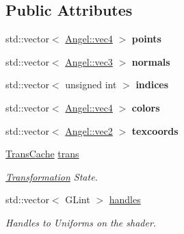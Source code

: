 \subsection*{Public Attributes}
\begin{DoxyCompactItemize}
\item 
\hypertarget{class_object_a8dec70177d147f59ba10c9eba8e9191b}{std\-::vector$<$ \hyperlink{struct_angel_1_1vec4}{Angel\-::vec4} $>$ {\bfseries points}}\label{class_object_a8dec70177d147f59ba10c9eba8e9191b}

\item 
\hypertarget{class_object_ad541a7bb180e24f59d752cc6d7f8c7e8}{std\-::vector$<$ \hyperlink{struct_angel_1_1vec3}{Angel\-::vec3} $>$ {\bfseries normals}}\label{class_object_ad541a7bb180e24f59d752cc6d7f8c7e8}

\item 
\hypertarget{class_object_a9b2fb19d129ad79407f9af0eea05b96c}{std\-::vector$<$ unsigned int $>$ {\bfseries indices}}\label{class_object_a9b2fb19d129ad79407f9af0eea05b96c}

\item 
\hypertarget{class_object_a4de4c1e2c4b621efb6f5d1b398ac6835}{std\-::vector$<$ \hyperlink{struct_angel_1_1vec4}{Angel\-::vec4} $>$ {\bfseries colors}}\label{class_object_a4de4c1e2c4b621efb6f5d1b398ac6835}

\item 
\hypertarget{class_object_a6d6c58ccb93f7a2bd7439d081134aaa0}{std\-::vector$<$ \hyperlink{struct_angel_1_1vec2}{Angel\-::vec2} $>$ {\bfseries texcoords}}\label{class_object_a6d6c58ccb93f7a2bd7439d081134aaa0}

\item 
\hypertarget{class_object_a1bb011587e4fa6e69984d5679546b1cb}{\hyperlink{class_trans_cache}{Trans\-Cache} \hyperlink{class_object_a1bb011587e4fa6e69984d5679546b1cb}{trans}}\label{class_object_a1bb011587e4fa6e69984d5679546b1cb}

\begin{DoxyCompactList}\small\item\em \hyperlink{class_transformation}{Transformation} State. \end{DoxyCompactList}\item 
std\-::vector$<$ G\-Lint $>$ \hyperlink{class_object_acd6c7021617ea334915a1525f9519bc5}{handles}
\begin{DoxyCompactList}\small\item\em Handles to Uniforms on the shader. \end{DoxyCompactList}\end{DoxyCompactItemize}
